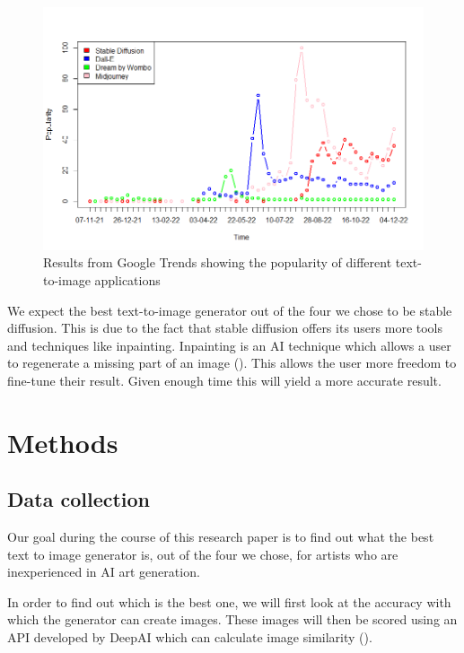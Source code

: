 \documentclass[]{report}
\begin{document}
	\begin{figure}[!h]
		\centering
		\includegraphics[width=1\linewidth]{TrendsPlotWithLegend}
		\caption{Results from Google Trends showing the popularity of different text-to-image applications}
		\label{fig:TrendsPlotWithLegend}
	\end{figure}
	
	
	We expect the best text-to-image generator out of the four we chose to be stable diffusion. This is due to the fact that stable diffusion offers its users more tools and techniques like inpainting. Inpainting is an AI technique which allows a user to regenerate a missing part of an image (\cite{inpaintingExplaination}). This allows the user more freedom to fine-tune their result. Given enough time this will yield a more accurate result.
	
	\pagebreak
	
	\section{Methods}
	
	\subsection{Data collection}
	Our goal during the course of this research paper is to find out what the best text to image generator is, out of the four we chose, for artists who are inexperienced in AI art generation.
	
	In order to find out which is the best one, we will first look at the accuracy with which the generator can create images. These images will then be scored using an API developed by DeepAI which can calculate image similarity (\cite{imageSimilarity}). 
	
\end{document}

